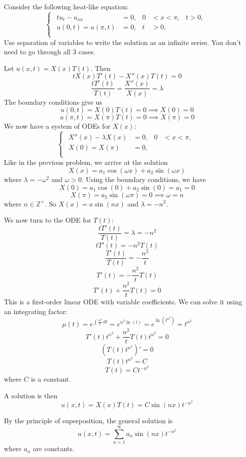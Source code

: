 \documentclass[plain]{pset}
\begin{document}
\begin{problem}
Consider the following heat-like equation:
\[
    \begin{cases}
        \begin{aligned}
            tu_t - u_{xx}             & = 0, & 0 & < x < \pi, & t > 0, \\
            u(0, t)       = u(\pi, t) & = 0, & t & > 0,                \\
        \end{aligned}
    \end{cases}
\]
Use separation of variables to write the solution as an infinite series. You don't need to go through all 3 cases.
\end{problem}
\begin{solution}
    Let \(u(x, t) = X(x)T(t)\). Then
    \[tX(x)T'(t) - X''(x)T(t) = 0\]
    \[\frac{tT'(t)}{T(t)} = \frac{X''(x)}{X(x)} = \lambda\]
    The boundary conditions give us
    \[u(0, t) = X(0)T(t) = 0 \implies X(0) = 0\]
    \[u(\pi, t) = X(\pi)T(t) = 0 \implies X(\pi) = 0\]
    We now have a system of ODEs for \(X(x)\):
    \[
        \begin{cases}
            \begin{aligned}
                X''(x) - \lambda X(x) & = 0, & 0 & < x < \pi, \\
                X(0) = X(\pi)         & = 0, &   &            \\
            \end{aligned}
        \end{cases}
    \]
    Like in the previous problem, we arrive at the solution
    \[X(x) = a_1\cos(\omega x) + a_2\sin(\omega x)\]
    where \(\lambda = -\omega^2\) and \(\omega > 0\).
    Using the boundary conditions, we have
    \[X(0) = a_1\cos(0) + a_2\sin(0) = a_1 = 0\]
    \[X(\pi) = a_2\sin(\omega\pi) = 0 \implies \omega = n\]
    where \(n \in \mathbb{Z}^+\). So \(X(x) = a\sin(nx)\) and \(\lambda = -n^2\).

    We now turn to the ODE for \(T(t)\):
    \[\frac{tT'(t)}{T(t)} = \lambda = -n^2\]
    \[tT'(t) = -n^2T(t)\]
    \[\frac{T'(t)}{T(t)} = -\frac{n^2}{t}\]
    \[T'(t) = -\frac{n^2}{t}T(t)\]
    \[T'(t) + \frac{n^2}{t}T(t) = 0\]
    This is a first-order linear ODE with variable coefficients. We can solve it using an integrating factor:
    \[\mu(t) = e^{\int\frac{n^2}{t}\,dt} = e^{n^2\ln(t)} = e^{\ln(t^{n^2})} = t^{n^2}\]
    \[T'(t)t^{n^2} + \frac{n^2}{t}T(t)t^{n^2} = 0\]
    \[\left(T(t)t^{n^2}\right)' = 0\]
    \[T(t)t^{n^2} = C\]
    \[T(t) = Ct^{-n^2}\]
    where \(C\) is a constant.

    A solution is then
    \[u(x, t) = X(x)T(t) = C\sin(nx)t^{-n^2}\]

    By the principle of superposition, the general solution is
    \[u(x, t) = \sum_{n=1}^\infty a_n\sin(nx)t^{-n^2}\]
    where \(a_n\) are constants.


\end{solution}
\end{document}
